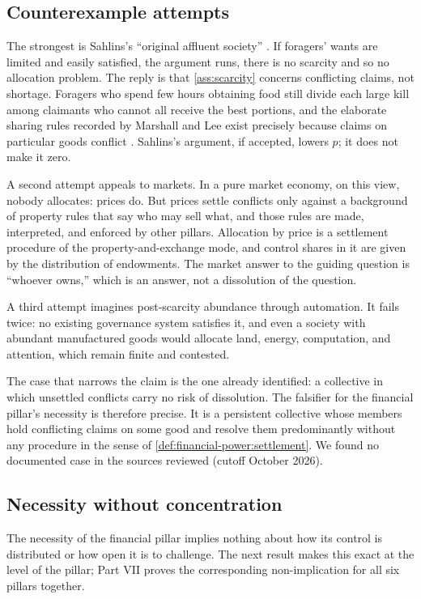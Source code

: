 \documentclass[11pt,letterpaper]{article}
\theoremstyle{definition}
\theoremstyle{remark}
\begin{document}
\subsection{Counterexample attempts}

The strongest is Sahlins's ``original affluent society'' \citep{sahlins1972b}. If foragers' wants are limited and easily satisfied, the argument runs, there is no scarcity and so no allocation problem. The reply is that \cref{ass:scarcity} concerns conflicting claims, not shortage. Foragers who spend few hours obtaining food still divide each large kill among claimants who cannot all receive the best portions, and the elaborate sharing rules recorded by Marshall and Lee exist precisely because claims on particular goods conflict \citep{marshall1976,lee1979}. Sahlins's argument, if accepted, lowers $p$; it does not make it zero.

A second attempt appeals to markets. In a pure market economy, on this view, nobody allocates: prices do. But prices settle conflicts only against a background of property rules that say who may sell what, and those rules are made, interpreted, and enforced by other pillars. Allocation by price is a settlement procedure of the property-and-exchange mode, and control shares in it are given by the distribution of endowments. The market answer to the guiding question is ``whoever owns,'' which is an answer, not a dissolution of the question.

A third attempt imagines post-scarcity abundance through automation. It fails twice: no existing governance system satisfies it, and even a society with abundant manufactured goods would allocate land, energy, computation, and attention, which remain finite and contested.

The case that narrows the claim is the one already identified: a collective in which unsettled conflicts carry no risk of dissolution. The falsifier for the financial pillar's necessity is therefore precise. It is a persistent collective whose members hold conflicting claims on some good and resolve them predominantly without any procedure in the sense of \cref{def:financial-power:settlement}. We found no documented case in the sources reviewed (cutoff October 2026).

\subsection{Necessity without concentration}

The necessity of the financial pillar implies nothing about how its control is distributed or how open it is to challenge. The next result makes this exact at the level of the pillar; Part VII proves the corresponding non-implication for all six pillars together.
\end{document}
